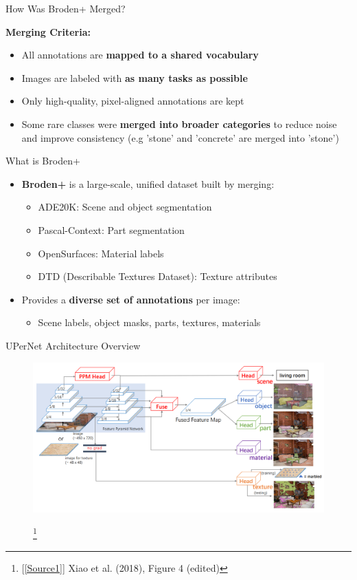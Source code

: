 \documentclass{beamer}
\newcommand\blfootnote[1]{
  \begingroup
  \renewcommand\thefootnote{}\footnote{#1}
  \addtocounter{footnote}{-1}
  \endgroup
}
\begin{document}
\begin{frame}{How Was Broden+ Merged?}
  
  \textbf{Merging Criteria:}
  \begin{itemize}
    \item All annotations are \textbf{mapped to a shared vocabulary}
    \item Images are labeled with \textbf{as many tasks as possible}
    \item Only high-quality, pixel-aligned annotations are kept
    \item Some rare classes were \textbf{merged into broader categories} to reduce noise and improve consistency (e.g 'stone' and 'concrete' are merged into 'stone')
  \end{itemize}
\end{frame}

\begin{frame}{What is Broden+}
  \begin{itemize}
    \item \textbf{Broden+} is a large-scale, unified dataset built by merging:
    \begin{itemize}
      \item ADE20K: Scene and object segmentation
      \item Pascal-Context: Part segmentation
      \item OpenSurfaces: Material labels
      \item DTD (Describable Textures Dataset): Texture attributes
    \end{itemize}
    \item Provides a \textbf{diverse set of annotations} per image:
    \begin{itemize}
      \item Scene labels, object masks, parts, textures, materials
    \end{itemize}
  \end{itemize}
\end{frame}


\begin{frame}{UPerNet Architecture Overview}
    \begin{figure}
        \centering
        \includegraphics[width=\textwidth]{Images/UPerNetArchitectureOverview_noHeads.png}
        \blfootnote{[\ref{Source1}] Xiao et al. (2018), Figure 4 (edited)}
    \end{figure}
\end{frame}
\end{document}
